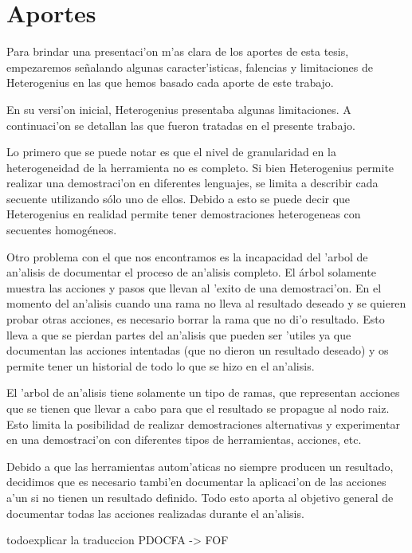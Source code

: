 \chapter{Aportes}

Para brindar una presentaci'on m'as clara de los aportes de esta tesis, empezaremos se\~nalando algunas caracter'isticas, falencias y limitaciones de Heterogenius en las que hemos basado cada aporte de este trabajo.

En su versi'on inicial, Heterogenius presentaba algunas limitaciones. 
A continuaci'on se detallan las que fueron tratadas en el presente trabajo.

Lo primero que se puede notar es que el nivel de granularidad en la heterogeneidad de la herramienta no es completo. 
Si bien Heterogenius permite realizar una demostraci'on en diferentes lenguajes, se limita a describir cada secuente utilizando sólo uno de ellos. 
Debido a esto se puede decir que Heterogenius en realidad permite tener demostraciones heterogeneas con secuentes homogéneos. 

Otro problema con el que nos encontramos es la incapacidad del 'arbol de an'alisis de documentar el proceso de an'alisis completo. El árbol solamente muestra las acciones y pasos que llevan al 'exito de una demostraci'on. En el momento del an'alisis cuando una rama no lleva al resultado deseado y se quieren probar otras acciones, es necesario borrar la rama que no di'o resultado. Esto lleva a que se pierdan partes del an'alisis que pueden ser 'utiles ya que documentan las acciones intentadas (que no dieron un resultado deseado) y os permite tener un historial de todo lo que se hizo en el an'alisis.

El 'arbol de an'alisis tiene solamente un tipo de ramas, que representan acciones que se tienen que llevar a cabo para que el resultado se propague al nodo raiz. Esto limita la posibilidad de realizar demostraciones alternativas y experimentar en una demostraci'on con diferentes tipos de herramientas, acciones, etc.

Debido a que las herramientas autom'aticas no siempre producen un resultado, decidimos que es necesario tambi'en documentar la aplicaci'on de las acciones a'un si no tienen un resultado definido. Todo esto aporta al objetivo general de documentar todas las acciones realizadas durante el an'alisis.



todo{explicar la traduccion PDOCFA -> FOF}







